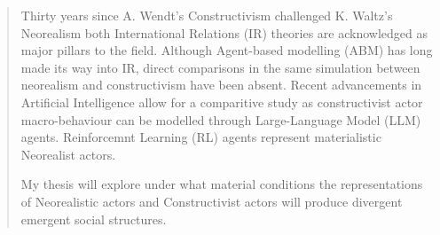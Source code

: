 \begin{abstract}
Thirty years since A. Wendt's Constructivism challenged K. Waltz's Neorealism both International Relations (IR) theories are acknowledged as major pillars to the field. Although Agent-based modelling (ABM) has long made its way into IR, direct comparisons in the same simulation between neorealism and constructivism have been absent. Recent advancements in Artificial Intelligence allow for a comparitive study as constructivist actor macro-behaviour can be modelled through Large-Language Model (LLM) agents. Reinforcemnt Learning (RL) agents represent materialistic Neorealist actors.

My thesis will explore under what material conditions the representations of Neorealistic actors and Constructivist actors will produce divergent emergent social structures.

\end{abstract}
